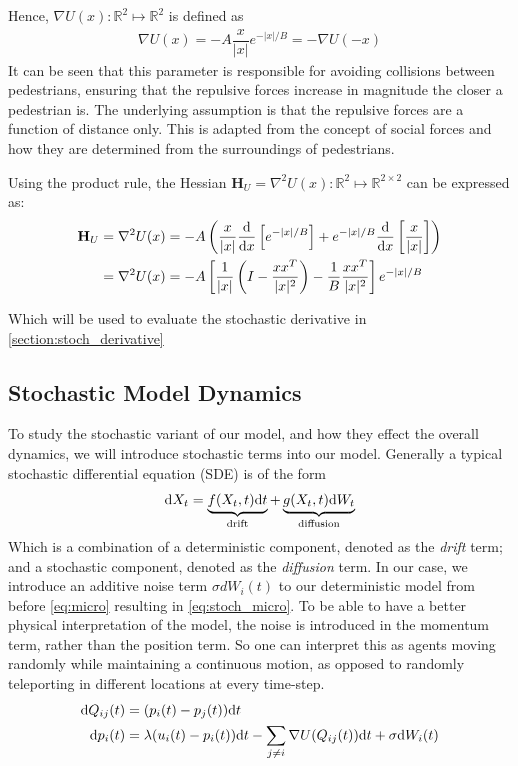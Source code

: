 Hence, $\nabla U(x):\mathbb{R}^2 \mapsto \mathbb{R}^2$ is defined as
\begin{align} 
    \nabla U(x) = -A\dfrac{x}{|x|}e^{-|x|/B} = -\nabla U(-x)
    \label{eq:def_U}
\end{align}
It can be seen that this parameter is responsible for avoiding collisions between pedestrians, ensuring that the repulsive forces increase in magnitude the closer a pedestrian is. The underlying assumption is that the repulsive forces are a function of distance only. This is adapted from the concept of social forces and how they are determined from the surroundings of pedestrians.

Using the product rule, the Hessian $\mathbf{H}_U = \nabla ^2 U(x):\mathbb{R}^2 \mapsto \mathbb{R}^{2\times2}$ can be expressed as:
\begin{align}
    \mathbf{H}_U &= \nabla^2 U(x) = -A\left(\dfrac{x}{|x|}\dfrac{\mathrm d}{\mathrm d x} \left[ e^{-|x|/B} \right] + e^{-|x|/B}\dfrac{\mathrm d}{\mathrm d x} \left[\dfrac{x}{|x|}\right]\right) \nonumber \\ 
    &= \nabla^2 U(x) = -A\left[\dfrac{1}{|x|}\left(I - \dfrac{xx^T}{|x|^2}\right) - \dfrac{1}{B}\dfrac{xx^T}{|x|^2}\right]e^{-|x|/B}
    \label{eq:def_ddU}
\end{align}

Which will be used to evaluate the stochastic derivative in \autoref{section:stoch_derivative}

\subsection{Stochastic Model Dynamics}

To study the stochastic variant of our model, and how they effect the overall dynamics, we will introduce stochastic terms into our model. Generally a typical stochastic differential equation (SDE) is of the form
\begin{equation*}
    \mathrm d X_t = \underbrace{f(X_t, t)\mathrm d t}_{\text{drift}} + \underbrace{g(X_t, t)\mathrm d W_t}_{\text{diffusion}}
\end{equation*}
Which is a combination of a deterministic component, denoted as the \textit{drift} term; and a stochastic component, denoted as the \textit{diffusion} term. In our case, we introduce an additive noise term $\sigma dW_i(t)$ to our deterministic model from before \autoref{eq:micro} resulting in \autoref{eq:stoch_micro}. To be able to have a better physical interpretation of the model, the noise is introduced in the momentum term, rather than the position term. So one can interpret this as agents moving randomly while maintaining a continuous motion, as opposed to randomly teleporting in different locations at every time-step.
\begin{gather}
\begin{aligned}
    \mathrm d Q_{ij}(t) &= (p_i(t) - p_j(t))\mathrm d t \\
    \mathrm d p_i(t) &= \lambda(u_i(t) - p_i(t))\mathrm d t - \sum_{j \neq i} \nabla U (Q_{ij}(t))\mathrm d t + \sigma \mathrm d W_i(t)
    \label{eq:stoch_micro}
\end{aligned}
\end{gather}

